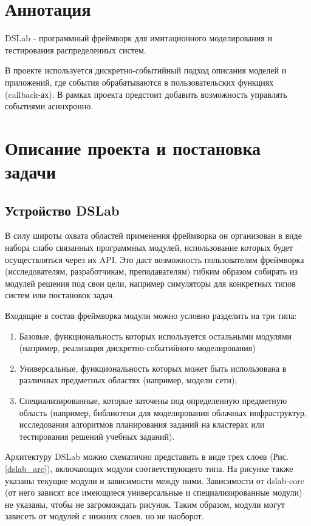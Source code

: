 

\section*{Аннотация}

DSLab - программный фреймворк для имитационного моделирования и тестирования распределенных систем.

В проекте используется дискретно-событийный подход описания моделей и приложений, где события обрабатываются в пользовательских функциях (callback-ах). В рамках проекта предстоит добавить возможность управлять событиями асинхронно.


\section{Описание проекта и постановка задачи}

\subsection{Устройство DSLab}

В силу широты охвата областей применения фреймворка он организован в виде набора слабо связанных программных модулей, использование которых будет осуществляться через их API. Это даст возможность пользователям фреймворка (исследователям, разработчикам, преподавателям) гибким образом собирать из модулей решения под свои цели, например симуляторы для конкретных типов систем или постановок задач.

Входящие в состав фреймворка модули можно условно разделить на три типа:
\begin{enumerate}
    \item 
    Базовые, функциональность которых используется остальными модулями (например, реализация дискретно-событийного моделирования)
    \item
    Универсальные, функциональность которых может быть использована в различных предметных областях (например, модели сети);
    \item
    Специализированные, которые заточены под определенную предметную область (например, библиотеки для моделирования облачных инфраструктур, исследования алгоритмов планирования заданий на кластерах или тестирования решений учебных заданий).
\end{enumerate}

Архитектуру DSLab можно схематично представить в виде трех слоев (Рис. \ref{dslab_arc}), включающих модули соответствующего типа. На рисунке также указаны текущие модули и зависимости между ними. Зависимости от dslab-core (от него зависят все имеющиеся универсальные и специализированные модули) не указаны, чтобы не загромождать рисунок. Таким образом, модули могут зависеть от модулей с нижних слоев, но не наоборот.

